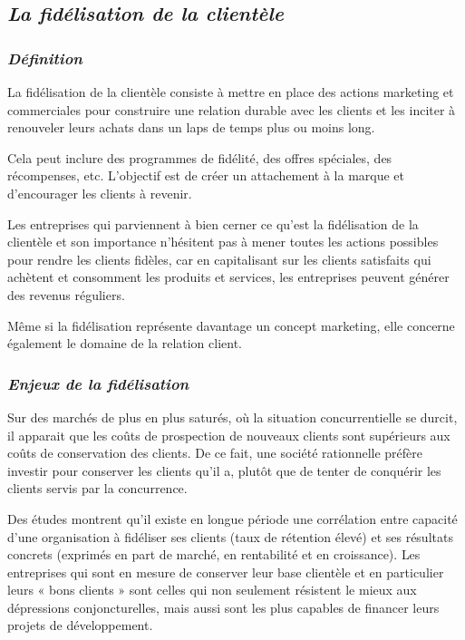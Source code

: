         \subsection[La fidélisation de la clientèle]{\textit{La fidélisation de la clientèle}}
            \subsubsection[Définition]{\textit{Définition}}
            La fidélisation de la clientèle consiste à mettre
            en place des actions marketing et commerciales
            pour construire une relation durable avec les
            clients et les inciter à renouveler leurs achats
            dans un laps de temps plus ou moins long. \cite*{Maud2022}
            \par
            Cela peut inclure des programmes de fidélité, des offres
            spéciales, des récompenses, etc.
            L’objectif est de créer un attachement à la marque et
            d’encourager les clients à revenir.
            \par
            Les entreprises qui parviennent à bien cerner ce qu’est
            la fidélisation de la clientèle et son importance n’hésitent
            pas à mener toutes les actions possibles pour rendre les clients
            fidèles, car en capitalisant sur les clients satisfaits
            qui achètent et consomment les produits et services, les entreprises
            peuvent générer des revenus réguliers.
            \par
            Même si la fidélisation représente davantage un concept marketing,
            elle concerne également le domaine de la relation client.
            \subsubsection[Enjeux de la fidélisation]{\textit{Enjeux de la fidélisation}}
            Sur des marchés de plus en plus saturés,
            où la situation concurrentielle se durcit, il apparait que les coûts de prospection
            de nouveaux clients sont supérieurs aux coûts de conservation des clients. \cite*{Reichheld2001loyalty}
            De ce fait, une société rationnelle préfère investir pour conserver
            les clients qu’il a, plutôt que de tenter de conquérir les clients servis par
            la concurrence.
            \par
            Des études montrent qu’il existe en longue période une corrélation entre capacité
            d’une organisation à fidéliser ses clients (taux de rétention élevé) et ses
            résultats concrets (exprimés en part de marché, en rentabilité et en croissance). \cite*{Reichheld2001loyalty}
            Les entreprises qui sont en
            mesure de conserver leur base clientèle et en particulier leurs « bons clients »
            sont celles qui non seulement résistent le mieux aux dépressions conjoncturelles,
            mais aussi sont les plus capables de financer leurs projets de développement.
